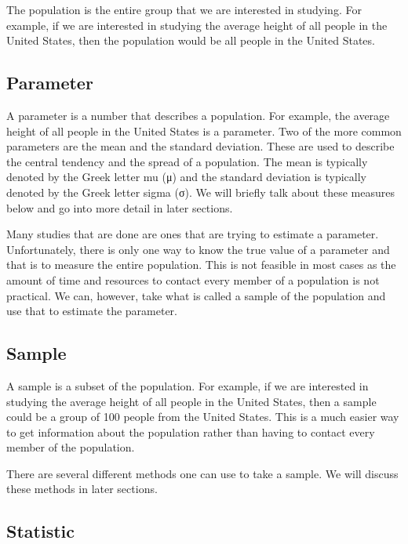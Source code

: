 \documentclass[
  letterpaper,
  DIV=11,
  numbers=noendperiod]{scrreprt}
\begin{document}
The population is the entire group that we are interested in studying.
For example, if we are interested in studying the average height of all
people in the United States, then the population would be all people in
the United States.

\subsection*{Parameter}\label{parameter}

A parameter is a number that describes a population. For example, the
average height of all people in the United States is a parameter. Two of
the more common parameters are the mean and the standard deviation.
These are used to describe the central tendency and the spread of a
population. The mean is typically denoted by the Greek letter mu (μ) and
the standard deviation is typically denoted by the Greek letter sigma
(σ). We will briefly talk about these measures below and go into more
detail in later sections.

Many studies that are done are ones that are trying to estimate a
parameter. Unfortunately, there is only one way to know the true value
of a parameter and that is to measure the entire population. This is not
feasible in most cases as the amount of time and resources to contact
every member of a population is not practical. We can, however, take
what is called a sample of the population and use that to estimate the
parameter.

\subsection*{Sample}\label{sample}

A sample is a subset of the population. For example, if we are
interested in studying the average height of all people in the United
States, then a sample could be a group of 100 people from the United
States. This is a much easier way to get information about the
population rather than having to contact every member of the population.

There are several different methods one can use to take a sample. We
will discuss these methods in later sections.

\subsection*{Statistic}\label{statistic}
\end{document}
